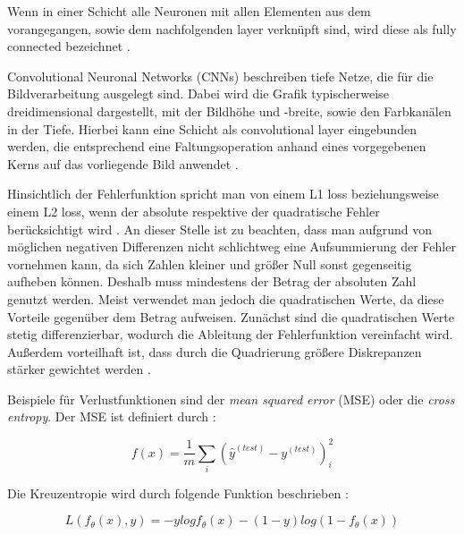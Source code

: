 \documentclass[12pt,a4paper]{article}
\begin{document}
Wenn in einer Schicht alle Neuronen mit allen Elementen aus dem vorangegangen, sowie dem nachfolgenden layer verknüpft sind, wird diese als fully connected bezeichnet \cite[S. 79]{Sewak2019}.

Convolutional Neuronal Networks (CNNs) beschreiben tiefe Netze, die für die Bildverarbeitung ausgelegt sind. Dabei wird die Grafik typischerweise dreidimensional dargestellt, mit der Bildhöhe und -breite, sowie den Farbkanälen in der Tiefe. Hierbei kann eine Schicht als convolutional layer eingebunden werden, die entsprechend eine Faltungsoperation anhand eines vorgegebenen Kerns auf das vorliegende Bild anwendet \cite[S. 85]{Sewak2019}.

Hinsichtlich der Fehlerfunktion spricht man von einem \glqq{}L1 loss\grqq{} beziehungsweise einem \glqq{}L2 loss\grqq{}, wenn der absolute respektive der quadratische Fehler berücksichtigt wird \cite[S. 82]{Sewak2019}. An dieser Stelle ist zu beachten, dass man aufgrund von möglichen negativen Differenzen nicht schlichtweg eine Aufsummierung der Fehler vornehmen kann, da sich Zahlen kleiner und größer Null sonst gegenseitig aufheben können. Deshalb muss mindestens der Betrag der absoluten Zahl genutzt werden. Meist verwendet man jedoch die quadratischen Werte, da diese Vorteile gegenüber dem Betrag aufweisen. Zunächst sind die quadratischen Werte stetig differenzierbar, wodurch die Ableitung der Fehlerfunktion vereinfacht wird. Außerdem vorteilhaft ist, dass durch die Quadrierung größere Diskrepanzen stärker gewichtet werden \cite[S. 41]{Kruse2015}.


Beispiele für Verlustfunktionen sind der \textit{mean squared error} (MSE) oder die \textit{cross entropy}.
Der MSE ist definiert durch \cite[S. 101]{Goodfellow2015}: 

\begin{equation}
f(x) = \frac{1}{m} \sum_{i} ( \hat{y}^{(test)} - y^{(test)} ) ^{2}_{i}
\end{equation}

Die Kreuzentropie wird durch folgende Funktion beschrieben \cite[S. 166]{Goodfellow2015}:

\begin{equation}
L(f_\theta (x), y) = -y log f_\theta (x) - (1 - y) log(1 - f_\theta(x))
\end{equation}
\end{document}
